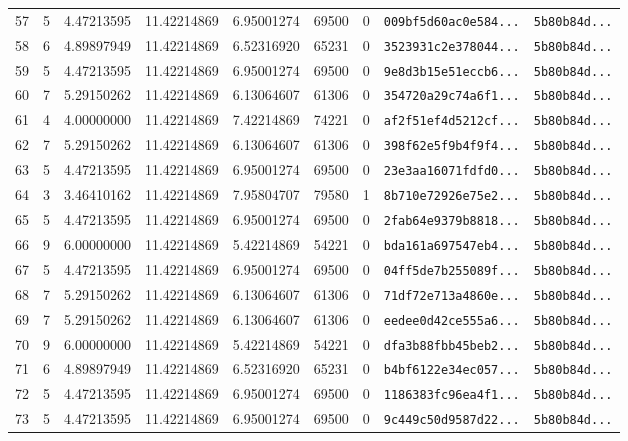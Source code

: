 \documentclass[10pt]{article}
\begin{document}
\begin{longtable}{rrrrrrrll}
  57 & 5 & 4.47213595 & 11.42214869 & 6.95001274 & 69500 & 0 & \texttt{009bf5d60ac0e584...} & \texttt{5b80b84d...} \\
  58 & 6 & 4.89897949 & 11.42214869 & 6.52316920 & 65231 & 0 & \texttt{3523931c2e378044...} & \texttt{5b80b84d...} \\
  59 & 5 & 4.47213595 & 11.42214869 & 6.95001274 & 69500 & 0 & \texttt{9e8d3b15e51eccb6...} & \texttt{5b80b84d...} \\
  60 & 7 & 5.29150262 & 11.42214869 & 6.13064607 & 61306 & 0 & \texttt{354720a29c74a6f1...} & \texttt{5b80b84d...} \\
  61 & 4 & 4.00000000 & 11.42214869 & 7.42214869 & 74221 & 0 & \texttt{af2f51ef4d5212cf...} & \texttt{5b80b84d...} \\
  62 & 7 & 5.29150262 & 11.42214869 & 6.13064607 & 61306 & 0 & \texttt{398f62e5f9b4f9f4...} & \texttt{5b80b84d...} \\
  63 & 5 & 4.47213595 & 11.42214869 & 6.95001274 & 69500 & 0 & \texttt{23e3aa16071fdfd0...} & \texttt{5b80b84d...} \\
  \rowcolor{cmpink!20} 64 & 3 & 3.46410162 & 11.42214869 & 7.95804707 & 79580 & 1 & \texttt{8b710e72926e75e2...} & \texttt{5b80b84d...} \\
  65 & 5 & 4.47213595 & 11.42214869 & 6.95001274 & 69500 & 0 & \texttt{2fab64e9379b8818...} & \texttt{5b80b84d...} \\
  66 & 9 & 6.00000000 & 11.42214869 & 5.42214869 & 54221 & 0 & \texttt{bda161a697547eb4...} & \texttt{5b80b84d...} \\
  67 & 5 & 4.47213595 & 11.42214869 & 6.95001274 & 69500 & 0 & \texttt{04ff5de7b255089f...} & \texttt{5b80b84d...} \\
  68 & 7 & 5.29150262 & 11.42214869 & 6.13064607 & 61306 & 0 & \texttt{71df72e713a4860e...} & \texttt{5b80b84d...} \\
  69 & 7 & 5.29150262 & 11.42214869 & 6.13064607 & 61306 & 0 & \texttt{eedee0d42ce555a6...} & \texttt{5b80b84d...} \\
  70 & 9 & 6.00000000 & 11.42214869 & 5.42214869 & 54221 & 0 & \texttt{dfa3b88fbb45beb2...} & \texttt{5b80b84d...} \\
  71 & 6 & 4.89897949 & 11.42214869 & 6.52316920 & 65231 & 0 & \texttt{b4bf6122e34ec057...} & \texttt{5b80b84d...} \\
  72 & 5 & 4.47213595 & 11.42214869 & 6.95001274 & 69500 & 0 & \texttt{1186383fc96ea4f1...} & \texttt{5b80b84d...} \\
  73 & 5 & 4.47213595 & 11.42214869 & 6.95001274 & 69500 & 0 & \texttt{9c449c50d9587d22...} & \texttt{5b80b84d...} \\

\end{longtable}
\end{document}
